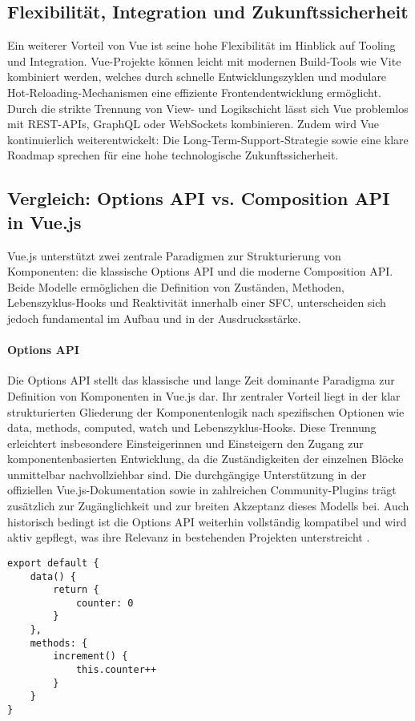 \subsection{Flexibilität, Integration und Zukunftssicherheit}
Ein weiterer Vorteil von Vue ist seine hohe Flexibilität im Hinblick auf Tooling und Integration. Vue-Projekte können leicht mit modernen Build-Tools wie Vite kombiniert werden, welches durch schnelle Entwicklungszyklen und modulare Hot-Reloading-Mechanismen eine effiziente Frontendentwicklung ermöglicht. Durch die strikte Trennung von View- und Logikschicht lässt sich Vue problemlos mit REST-APIs, GraphQL oder WebSockets kombinieren. Zudem wird Vue kontinuierlich weiterentwickelt: Die Long-Term-Support-Strategie sowie eine klare Roadmap sprechen für eine hohe technologische Zukunftssicherheit.

\subsection{Vergleich: Options API vs. Composition API in Vue.js}
Vue.js unterstützt zwei zentrale Paradigmen zur Strukturierung von Komponenten: die klassische Options API und die moderne Composition API. Beide Modelle ermöglichen die Definition von Zuständen, Methoden, Lebenszyklus-Hooks und Reaktivität innerhalb einer \ac{SFC}, unterscheiden sich jedoch fundamental im Aufbau und in der Ausdrucksstärke.

\paragraph{Options API}
Die Options API stellt das klassische und lange Zeit dominante Paradigma zur Definition von Komponenten in Vue.js dar. Ihr zentraler Vorteil liegt in der klar strukturierten Gliederung der Komponentenlogik nach spezifischen Optionen wie data, methods, computed, watch und Lebenszyklus-Hooks. Diese Trennung erleichtert insbesondere Einsteigerinnen und Einsteigern den Zugang zur komponentenbasierten Entwicklung, da die Zuständigkeiten der einzelnen Blöcke unmittelbar nachvollziehbar sind. Die durchgängige Unterstützung in der offiziellen Vue.js-Dokumentation sowie in zahlreichen Community-Plugins trägt zusätzlich zur Zugänglichkeit und zur breiten Akzeptanz dieses Modells bei. Auch historisch bedingt ist die Options API weiterhin vollständig kompatibel und wird aktiv gepflegt, was ihre Relevanz in bestehenden Projekten unterstreicht \cite{VueGuide2024}.

\newpage
\begin{lstlisting}[caption=Beispiel Options API]
export default {
	data() {
		return {
			counter: 0
		}
	},
	methods: {
		increment() {
			this.counter++
		}
	}
}
\end{lstlisting}

